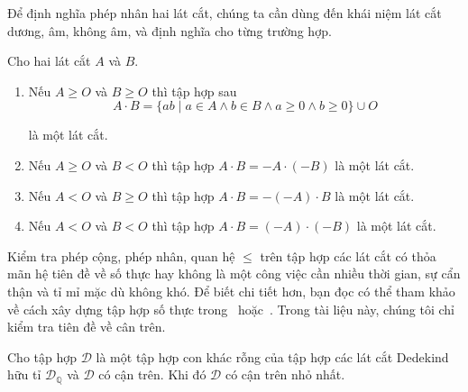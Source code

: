 Để định nghĩa phép nhân hai lát cắt, chúng ta cần dùng đến khái niệm lát cắt dương, âm, không âm, và định nghĩa cho từng trường hợp.
\begin{theorem}
	Cho hai lát cắt $A$ và $B$.
	\begin{enumerate}[label={(\roman*)}]
		\item Nếu $A\geq O$ và $B\geq O$ thì tập hợp sau
		      \[
			      A\cdot B = \{ ab \mid a\in A\wedge b\in B\wedge a\geq 0\wedge b\geq 0 \} \cup O
		      \]

		      là một lát cắt.
		\item Nếu $A\geq O$ và $B < O$ thì tập hợp $A\cdot B = -A\cdot (-B)$ là một lát cắt.
		\item Nếu $A < O$ và $B\geq O$ thì tập hợp $A\cdot B = -(-A)\cdot B$ là một lát cắt.
		\item Nếu $A < O$ và $B < O$ thì tập hợp $A\cdot B = (-A)\cdot (-B)$ là một lát cắt.
	\end{enumerate}
\end{theorem}

Kiểm tra phép cộng, phép nhân, quan hệ $\leq$ trên tập hợp các lát cắt có thỏa mãn hệ tiên đề về số thực hay không là một công việc cần nhiều thời gian, sự cẩn thận và tỉ mỉ mặc dù không khó. Để biết chi tiết hơn, bạn đọc có thể tham khảo về cách xây dựng tập hợp số thực trong~\cite{spivak} hoặc~\cite{abbott}. Trong tài liệu này, chúng tôi chỉ kiểm tra tiên đề về cân trên.

\begin{theorem}
	Cho tập hợp $\mathscr{D}$ là một tập hợp con khác rỗng của tập hợp các lát cắt Dedekind hữu tỉ $\mathscr{D}_{\mathbb{Q}}$ và $\mathscr{D}$ có cận trên. Khi đó $\mathscr{D}$ có cận trên nhỏ nhất.
\end{theorem}

